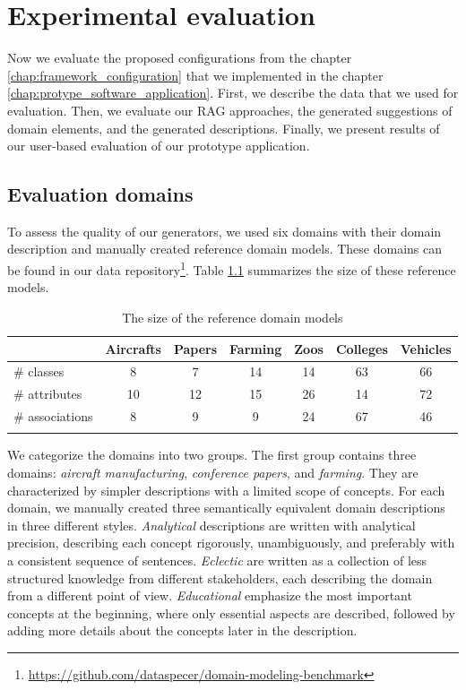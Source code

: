 \chapter{Experimental evaluation}
\label{chap:evaluation}

Now we evaluate the proposed configurations from the chapter \ref{chap:framework_configuration} that we implemented in the chapter \ref{chap:protype_software_application}. First, we describe the data that we used for evaluation. Then, we evaluate our RAG approaches, the generated suggestions of domain elements, and the generated descriptions. Finally, we present results of our user-based evaluation of our prototype application.


\section{Evaluation domains}

To assess the quality of our generators, we used six domains with their domain description and manually created reference domain models. These domains can be found in our data repository\footnote{\url{https://github.com/dataspecer/domain-modeling-benchmark}}. Table \ref{tab:reference-model-size} summarizes the size of these reference models.

\begin{table}[!h]
    \scriptsize
    \centering
    \setlength{\tabcolsep}{0.5em}
    \begin{tabular}{lcccccc}
         & Aircrafts & Papers & Farming & Zoos & Colleges & Vehicles \\
    \toprule
    \addlinespace
         \# classes      & 8  & 7  & 14 & 14 & 63 & 66 \\
         \# attributes   & 10 & 12 & 15 & 26 & 14 & 72 \\
         \# associations & 8  & 9  & 9  & 24 & 67 & 46 \\
    \addlinespace
    \bottomrule
    \addlinespace
    \end{tabular}
    \caption{The size of the reference domain models}
    \label{tab:reference-model-size}
\end{table}


We categorize the domains into two groups.
The first group contains three domains: \emph{aircraft manufacturing}, \emph{conference papers}, and \emph{farming}.
They are characterized by simpler descriptions with a limited scope of concepts.
For each domain, we manually created three semantically equivalent domain descriptions in three different styles.
\emph{Analytical} descriptions are written with analytical precision, describing each concept rigorously, unambiguously, and preferably with a consistent sequence of sentences.
\emph{Eclectic} are written as a collection of less structured knowledge from different stakeholders, each describing the domain from a different point of view.
\emph{Educational} emphasize the most important concepts at the beginning, where only essential aspects are described, followed by adding more details about the concepts later in the description.


